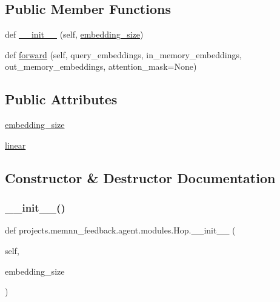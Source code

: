\subsection*{Public Member Functions}
\begin{DoxyCompactItemize}
\item 
def \hyperlink{classprojects_1_1memnn__feedback_1_1agent_1_1modules_1_1Hop_a389f38122323e5f5f74241656a0df48a}{\+\_\+\+\_\+init\+\_\+\+\_\+} (self, \hyperlink{classprojects_1_1memnn__feedback_1_1agent_1_1modules_1_1Hop_a8fb50dd7d635522ebe5b2d36f6d4bc48}{embedding\+\_\+size})
\item 
def \hyperlink{classprojects_1_1memnn__feedback_1_1agent_1_1modules_1_1Hop_a49bc88135a02e336541fba3798321df8}{forward} (self, query\+\_\+embeddings, in\+\_\+memory\+\_\+embeddings, out\+\_\+memory\+\_\+embeddings, attention\+\_\+mask=None)
\end{DoxyCompactItemize}
\subsection*{Public Attributes}
\begin{DoxyCompactItemize}
\item 
\hyperlink{classprojects_1_1memnn__feedback_1_1agent_1_1modules_1_1Hop_a8fb50dd7d635522ebe5b2d36f6d4bc48}{embedding\+\_\+size}
\item 
\hyperlink{classprojects_1_1memnn__feedback_1_1agent_1_1modules_1_1Hop_a373c95e927a46152f811742f2653030f}{linear}
\end{DoxyCompactItemize}


\subsection{Constructor \& Destructor Documentation}
\mbox{\label{classprojects_1_1memnn__feedback_1_1agent_1_1modules_1_1Hop_a389f38122323e5f5f74241656a0df48a}} 
\subsubsection{\texorpdfstring{\+\_\+\+\_\+init\+\_\+\+\_\+()}{\_\_init\_\_()}}
{\footnotesize\ttfamily def projects.\+memnn\+\_\+feedback.\+agent.\+modules.\+Hop.\+\_\+\+\_\+init\+\_\+\+\_\+ (\begin{DoxyParamCaption}\item[{}]{self,  }\item[{}]{embedding\+\_\+size }\end{DoxyParamCaption})}



